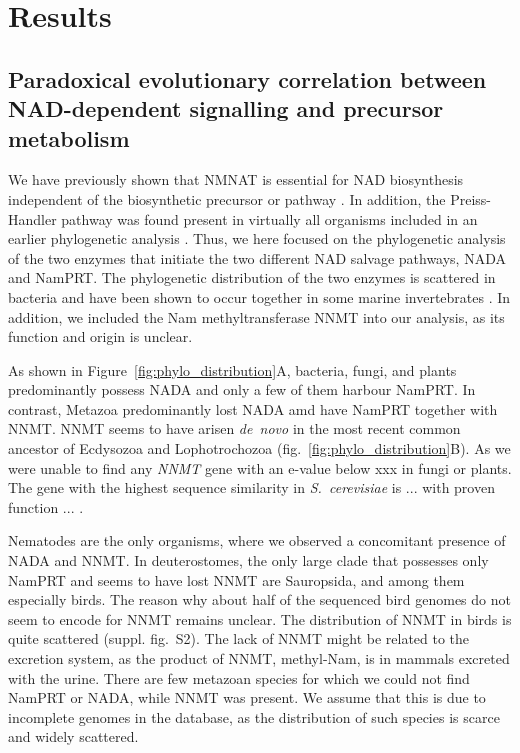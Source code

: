 
\section{Results}

\subsection{Paradoxical evolutionary correlation between NAD-dependent signalling and precursor metabolism}

We have previously shown that NMNAT is essential for NAD biosynthesis independent of the biosynthetic precursor or pathway \cite{DeFigueiredo2011}. In addition, the Preiss-Handler pathway was found  present in virtually all organisms included in an earlier phylogenetic analysis \cite{Gossmann2012FEBS}. Thus, we here focused on the phylogenetic analysis of the two enzymes that initiate the two different NAD salvage pathways, NADA and NamPRT. The phylogenetic distribution of the two enzymes is scattered in bacteria  and have been shown to occur together in some marine invertebrates \cite{Gossmann2012FEBS}. In addition, we included the Nam methyltransferase NNMT into our analysis, as its function and origin is unclear.

As shown in Figure~\ref{fig:phylo_distribution}A, bacteria, fungi, and plants predominantly possess NADA and only a few of them harbour NamPRT. In contrast, Metazoa predominantly lost NADA amd have NamPRT together with NNMT. NNMT seems to have arisen \textit{de~novo} in the most recent common ancestor of Ecdysozoa and Lophotrochozoa (fig.~\ref{fig:phylo_distribution}B). As we were unable to find any \textit{NNMT} gene with an e-value below xxx  in fungi or plants. The gene with the highest sequence similarity in \textit{S.~cerevisiae} is ... with proven function ... .

Nematodes are the only organisms, where we observed a concomitant presence of NADA and NNMT. In deuterostomes, the only large clade that possesses only NamPRT and seems to have lost NNMT are Sauropsida, and among them especially birds. The reason why about half of the sequenced bird genomes do not seem to encode for NNMT remains unclear. The distribution of NNMT in birds is quite scattered (suppl. fig.~S2).  The lack of NNMT might be related to the excretion system, as the product of NNMT, methyl-Nam, is in mammals excreted with the urine. There are few metazoan species for which we could not find NamPRT or NADA, while NNMT was present. We assume that this is due to incomplete genomes in the database, as the distribution of such species is scarce and widely scattered.

